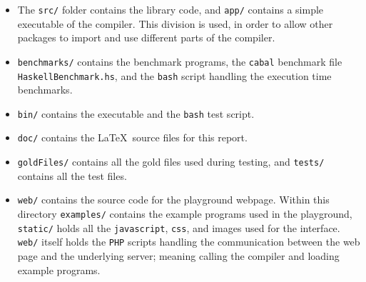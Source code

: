 \begin{itemize}
    \item The \texttt{src/} folder contains the \lan library code, and \texttt{app/} contains a
          simple executable of the compiler. This division is used, in order to allow other
          packages to import and use different parts of the \lan compiler.

    \item \texttt{benchmarks/} contains the benchmark
          programs, the \texttt{cabal} benchmark file \texttt{HaskellBenchmark.hs}, and the
          \texttt{bash} script handling the execution time benchmarks.
    
    \item \texttt{bin/} contains the \lan executable and the \texttt{bash} test script.

    \item \texttt{doc/} contains the \LaTeX ~source files for this report.

    \item \texttt{goldFiles/} contains all the gold files used during testing, and
          \texttt{tests/} contains all the \lan test files.

    \item \texttt{web/} contains the source code for the \lan playground webpage. Within this
          directory \texttt{examples/} contains the example programs used in the playground,
          \texttt{static/} holds all the \texttt{javascript}, \texttt{css}, and images
          used for the interface. \texttt{web/} itself holds the \texttt{PHP} scripts
          handling the communication between the web page and the underlying server;
          meaning calling the \lan compiler and loading example programs.
\end{itemize}

